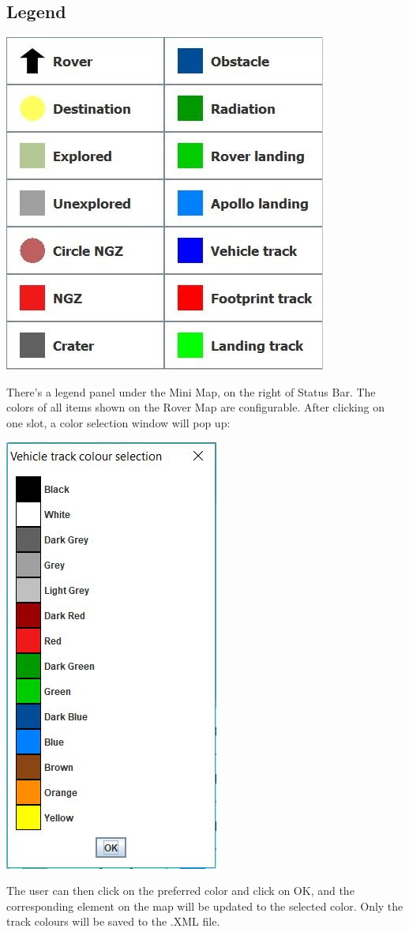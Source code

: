 \documentclass[12pt]{article}
\begin{document}
	\subsection{Legend}
		\begin{center}
		\includegraphics[scale=1]{Legend.jpg}
		\end{center}
There’s a legend panel under the Mini Map, on the right of Status Bar. The colors of all items shown on the Rover Map are configurable. After clicking on one slot, a color selection window will pop up:
		\begin{center}
		\includegraphics[scale=1]{ColourSelection.jpg}
		\end{center}
The user can then click on the preferred color and click on OK, and the corresponding element on the map will be updated to the selected color. Only the track colours will be saved to the .XML file.
		
\end{document}
